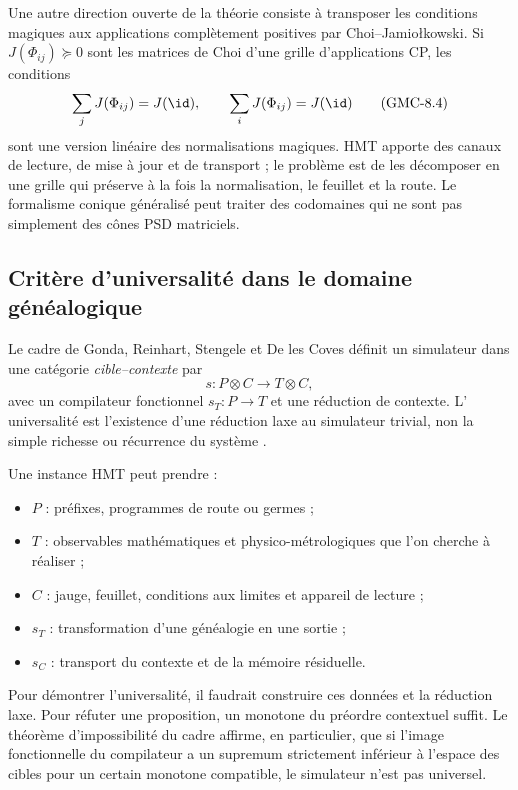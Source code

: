 Une autre direction ouverte de la théorie consiste à transposer les conditions
magiques aux applications complètement positives par Choi--Jamiołkowski. Si
$J(\Phi_{ij})\succeq0$ sont les matrices de Choi d'une grille d'applications CP,
les conditions
\[
 \sum_jJ(\Phi_{ij})=J(\id),
 \qquad
 \sum_iJ(\Phi_{ij})=J(\id)
 \tag{GMC-8.4}
\]
sont une version linéaire des normalisations magiques. HMT apporte des canaux de
lecture, de mise à jour et de transport ; le problème est de les décomposer en une
grille qui préserve à la fois la normalisation, le feuillet et la route. Le formalisme
conique généralisé peut traiter des codomaines qui ne sont pas simplement des cônes
PSD matriciels.

\subsection{Critère d'universalité dans le domaine généalogique}

Le cadre de Gonda, Reinhart, Stengele et De les Coves définit un simulateur dans
une catégorie \emph{cible--contexte} par
\[
 s:P\otimes C\longrightarrow T\otimes C,
 \tag{GMC-8.5}
\]
avec un compilateur fonctionnel $s_T:P\to T$ et une réduction de contexte. L'
universalité est l'existence d'une réduction laxe au simulateur trivial,
non la simple richesse ou récurrence du système
\citep{gonda2024universality}.

Une instance HMT peut prendre :

\begin{itemize}
 \item $P$ : préfixes, programmes de route ou germes ;
 \item $T$ : observables mathématiques et physico-métrologiques que l'on cherche à
 réaliser ;
 \item $C$ : jauge, feuillet, conditions aux limites et appareil de lecture ;
\item $s_T$ : transformation d'une généalogie en une sortie ;
 \item $s_C$ : transport du contexte et de la mémoire résiduelle.
\end{itemize}

Pour démontrer l'universalité, il faudrait construire ces données et la réduction
laxe. Pour réfuter une proposition, un monotone du préordre contextuel suffit.
Le théorème d'impossibilité du cadre affirme, en particulier, que si l'image
fonctionnelle du compilateur a un supremum strictement inférieur à l'espace des
cibles pour un certain monotone compatible, le simulateur n'est pas universel.

